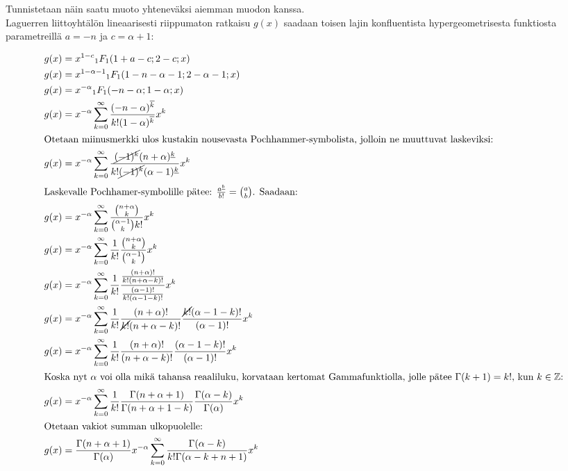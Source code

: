 \documentclass[../johdoksia.tex]{subfiles}
\begin{document}
	\noindent Tunnistetaan näin saatu muoto yhteneväksi aiemman muodon kanssa. \\
	
	Laguerren liittoyhtälön lineaarisesti riippumaton ratkaisu $g(x)$ saadaan toisen lajin konfluentista hypergeometrisesta funktiosta parametreillä $a = -n$ ja $c = \alpha + 1$:
	
	\begin{align*}
		g(x) &= x^{1 - c}{_1{F}_1}(1 + a - c; 2 - c; x) \\
		g(x) &= x^{1 - \alpha - 1}{_1{F}_1}(1 - n - \alpha - 1; 2 - \alpha - 1; x) \\
		g(x) &= x^{-\alpha}{_1{F}_1}(- n - \alpha; 1 - \alpha ; x) \\
		g(x) &= x^{-\alpha}\sum_{k = 0}^{\infty}\frac{(-n-\alpha)^{\overline{k}}}{k!(1 - \alpha)^{\overline{k}}}x^k \\
		\intertext{Otetaan miinusmerkki ulos kustakin nousevasta Pochhammer-symbolista, jolloin ne muuttuvat laskeviksi:}
		g(x) &= x^{-\alpha}\sum_{k = 0}^{\infty}\frac{\cancel{(-1)^k}(n+\alpha)^{\underline{k}}}{k!\cancel{(-1)^k}(\alpha - 1)^{\underline{k}}}x^k \\
		\intertext{Laskevalle Pochhamer-symbolille pätee: $\frac{a^{\underline{b}}}{b!} = \binom{a}{b}$. Saadaan:}
		g(x) &= x^{-\alpha}\sum_{k = 0}^{\infty}\frac{\binom{n + \alpha}{k}}{\binom{\alpha - 1}{k}k!}x^k \\
		g(x) &= x^{-\alpha}\sum_{k = 0}^{\infty}\frac{1}{k!}\frac{\binom{n + \alpha}{k}}{\binom{\alpha - 1}{k}}x^k \\
		g(x) &= x^{-\alpha}\sum_{k = 0}^{\infty}\frac{1}{k!}\frac{\frac{(n + \alpha)!}{k!(n + \alpha - k)!}}{\frac{(\alpha - 1)!}{k!(\alpha - 1 - k)!}}x^k \\
		g(x) &= x^{-\alpha}\sum_{k = 0}^{\infty}\frac{1}{k!}\frac{(n + \alpha)!}{\cancel{k!}(n + \alpha - k)!}\frac{\cancel{k!}(\alpha - 1 - k)!}{(\alpha - 1)!}x^k \\
		g(x) &= x^{-\alpha}\sum_{k = 0}^{\infty}\frac{1}{k!}\frac{(n + \alpha)!}{(n + \alpha - k)!}\frac{(\alpha - 1 - k)!}{(\alpha - 1)!}x^k \\
		\intertext{Koska nyt $\alpha$ voi olla mikä tahansa reaaliluku, korvataan kertomat Gammafunktiolla, jolle pätee $\Gamma(k + 1) = k!$, kun $k\in\mathbb{Z}$:}
		g(x) &= x^{-\alpha}\sum_{k = 0}^{\infty}\frac{1}{k!}\frac{\Gamma(n + \alpha + 1)}{\Gamma(n + \alpha + 1 - k)}\frac{\Gamma(\alpha - k)}{\Gamma(\alpha)}x^k \\
		\intertext{Otetaan vakiot summan ulkopuolelle:}
		g(x) &= \frac{\Gamma(n + \alpha + 1)}{\Gamma(\alpha)}x^{-\alpha}\sum_{k = 0}^{\infty}\frac{\Gamma(\alpha - k)}{k!\Gamma(\alpha - k + n + 1)}x^k \\
	\end{align*}
\end{document}
